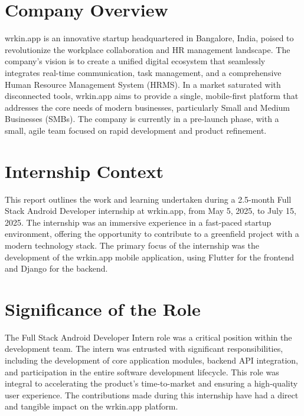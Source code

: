 \section{Company Overview}
wrkin.app is an innovative startup headquartered in Bangalore, India, poised to revolutionize the workplace collaboration and HR management landscape. The company's vision is to create a unified digital ecosystem that seamlessly integrates real-time communication, task management, and a comprehensive Human Resource Management System (HRMS). In a market saturated with disconnected tools, wrkin.app aims to provide a single, mobile-first platform that addresses the core needs of modern businesses, particularly Small and Medium Businesses (SMBs). The company is currently in a pre-launch phase, with a small, agile team focused on rapid development and product refinement.

\section{Internship Context}
This report outlines the work and learning undertaken during a 2.5-month Full Stack Android Developer internship at wrkin.app, from May 5, 2025, to July 15, 2025. The internship was an immersive experience in a fast-paced startup environment, offering the opportunity to contribute to a greenfield project with a modern technology stack. The primary focus of the internship was the development of the wrkin.app mobile application, using Flutter for the frontend and Django for the backend.

\section{Significance of the Role}
The Full Stack Android Developer Intern role was a critical position within the development team. The intern was entrusted with significant responsibilities, including the development of core application modules, backend API integration, and participation in the entire software development lifecycle. This role was integral to accelerating the product's time-to-market and ensuring a high-quality user experience. The contributions made during this internship have had a direct and tangible impact on the wrkin.app platform.

